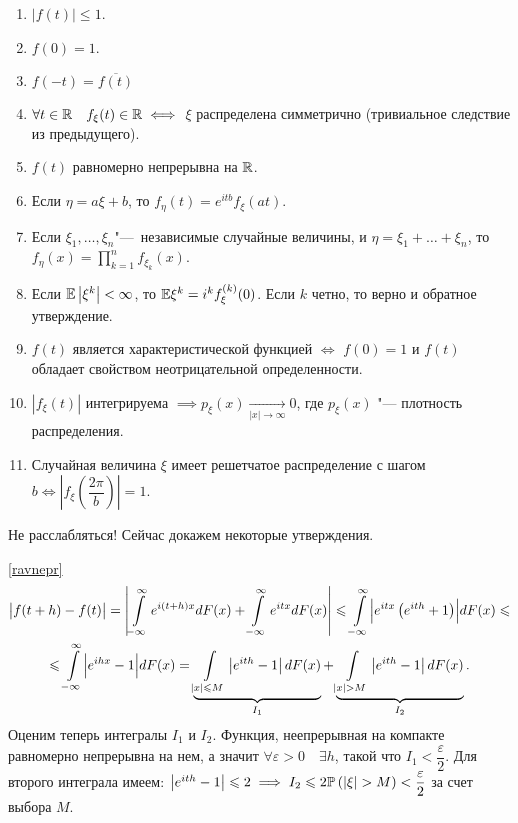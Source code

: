 \documentclass[../TV&MS.tex]{subfiles}
\begin{document}
\begin{enumerate}
    \item $ \left| f(t) \right| \leqslant 1 $.
    \item $f(0) = 1$.
    \item $f(-t) = \overline{f(t)}$ 
    \item $\forall t \in \mathbb{R} \quad f_\xi(t) \in \mathbb{R} \iff$  $\xi$ распределена симметрично (тривиальное следствие из предыдущего).
    \item\label{ravnepr} $f(t)$ равномерно непрерывна на $\mathbb{R}$.
    \item Если $\eta = a\xi + b$, то $f_\eta(t) = e^{itb}f_\xi(at)$.
    \item\label{nez} Если $\xi_1,  \ldots , \xi_n$"---~независимые случайные величины, и 
    $\eta = \xi_1 +  \ldots + \xi_n$, то $f_\eta(x) = \prod\limits_{k=1}^{n} 
    f_{\xi_k}(x)$.
    \item\label{moments} Если $\mathbb{E} \left|\xi^k\right| < \infty$, то 
    $\mathbb{E} \xi^k = i^k f^{(k)}_\xi(0)$.
    Если $k$ четно, то верно и обратное утверждение.
    \item \begin{Th}
            $f(t)$ является характеристической функцией $\iff$ $f(0) = 1$ 
            и  $f(t)$ обладает свойством неотрицательной определенности.
          \end{Th}
    \item $ \left| f_\xi(t) \right|$ интегрируема 
         $\implies p_\xi(x) \xrightarrow[ \left| x \right| \rightarrow \infty]{} 0$,
         где $p_\xi(x)$ "--- плотность распределения.
    \item Случайная величина $\xi$ имеет решетчатое распределение с шагом
        $b \iff \left| f_\xi \left( \dfrac{2\pi}{b} \right) \right| = 1$. 
\end{enumerate}

Не расслабляться! Сейчас докажем некоторые утверждения.

\begin{Proof} \eqref{ravnepr}
\begin{multline*}
    \bigl| f(t + h) - f(t) \bigr| = 
    \left| \int\limits_{-\infty}^{\infty} e^{i(t+h)x}dF(x) + 
    \int\limits_{-\infty}^{\infty} e^{itx}dF(x) \right| \leqslant
    \int\limits_{-\infty}^{\infty} \Bigl| e^{itx} \left( e^{ith} + 1 \right)  \Bigr| dF(x) \leqslant \\
    \leqslant \int\limits_{-\infty}^{\infty} \Bigl| e^{ihx} - 1 \Bigr| dF(x) =
    \underbrace{\int\limits_{|x| \leqslant M}^{} \left| e^{ith} - 1 \right| dF(x)}_{I_1} + 
    \underbrace{\int\limits_{|x| > M}^{} \left| e^{ith}-1 \right|dF(x)}_{I_2} 
.\end{multline*}
Оценим теперь интегралы $I_1$ и $I_2$.
Функция, неепрерывная на компакте равномерно непрерывна на нем, а значит
$\forall \varepsilon > 0 \quad \exists h$, такой что $I_1 < \dfrac{\varepsilon}{2}$.
Для второго интеграла имеем: $ \left| e^{ith} - 1 \right|\leqslant 2 \implies
I_2 \leqslant 2\mathbb{P} \left( \left| \xi \right| > M \right) < \dfrac{\varepsilon}{2}$ за счет выбора $M$.
\end{Proof} 
\end{document}
